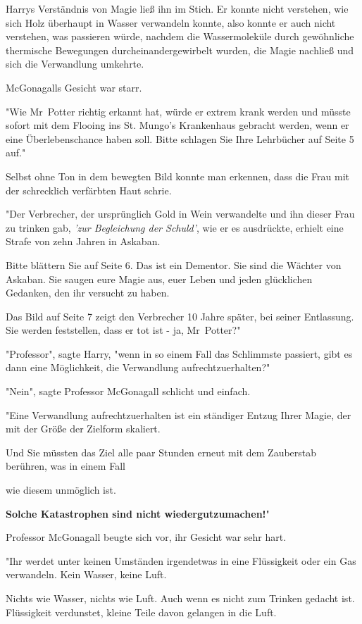 {Harrys Verständnis von Magie ließ ihn im Stich. Er konnte nicht verstehen, wie sich Holz überhaupt in Wasser verwandeln konnte, also konnte er auch nicht verstehen, was passieren würde, nachdem die Wassermoleküle durch gewöhnliche thermische Bewegungen durcheinandergewirbelt wurden, die Magie nachließ und sich die Verwandlung umkehrte.

McGonagalls Gesicht war starr.

"Wie Mr~Potter richtig erkannt hat, würde er extrem krank werden und müsste sofort mit dem Flooing ins St. Mungo's Krankenhaus gebracht werden, wenn er eine Überlebenschance haben soll. Bitte schlagen Sie Ihre Lehrbücher auf Seite 5 auf."

Selbst ohne Ton in dem bewegten Bild konnte man erkennen, dass die Frau mit der schrecklich verfärbten Haut schrie.

"Der Verbrecher, der ursprünglich Gold in Wein verwandelte und ihn dieser Frau zu trinken gab, \emph{'zur Begleichung der Schuld'}, wie er es ausdrückte, erhielt eine Strafe von zehn Jahren in Askaban.

Bitte blättern Sie auf Seite 6. Das ist ein Dementor. Sie sind die Wächter von Askaban. Sie saugen eure Magie aus, euer Leben und jeden glücklichen Gedanken, den ihr versucht zu haben.

Das Bild auf Seite 7 zeigt den Verbrecher 10 Jahre später, bei seiner Entlassung. Sie werden feststellen, dass er tot ist - ja, Mr~Potter?"

"Professor", sagte Harry, "wenn in so einem Fall das Schlimmste passiert, gibt es dann eine Möglichkeit, die Verwandlung aufrechtzuerhalten?"

"Nein", sagte Professor McGonagall schlicht und einfach.

"Eine Verwandlung aufrechtzuerhalten ist ein ständiger Entzug Ihrer Magie, der mit der Größe der Zielform skaliert.

Und Sie müssten das Ziel alle paar Stunden erneut mit dem Zauberstab berühren, was in einem Fall

wie diesem unmöglich ist.

\textbf{Solche Katastrophen sind nicht wiedergutzumachen!}"

Professor McGonagall beugte sich vor, ihr Gesicht war sehr hart.

"Ihr werdet unter keinen Umständen irgendetwas in eine Flüssigkeit oder ein Gas verwandeln. Kein Wasser, keine Luft.

Nichts wie Wasser, nichts wie Luft. Auch wenn es nicht zum Trinken gedacht ist. Flüssigkeit verdunstet, kleine Teile davon gelangen in die Luft.

}
